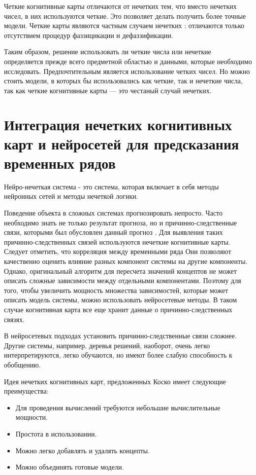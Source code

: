 Четкие когнитивные карты отличаются от нечетких тем, что
вместо нечетких чисел, в них используются четкие. Это позволяет
делать получить более точные модели.
Четкие карты являются частным случаем нечетких \cite{kayashev2014cognitive}: отличаются только отсутствием
процедур фаззицикации и дефаззификации.

Таким образом, решение использовать ли четкие числа или нечеткие
определяется прежде всего предметной областью и данными, которые
необходимо исследовать. Предпочтительным является использование
четких чисел. Но можно стоить модели, в которых бы использовались
как четкие, так и нечеткие числа, так как четкие когнитивные
карты --- это честаный случай нечетких.

\section{Интеграция нечетких когнитивных карт и нейросетей для предсказания временных рядов}

Нейро-нечеткая система - это система, которая включает в себя методы нейронных сетей и методы нечеткой логики.

Поведение объекта в сложных системах прогнозировать непросто.
Часто необходимо знать не только результат прогноза,
но и причинно-следственные связи, которыми был обусловлен данный прогноз
\cite{osoba2019dags} \cite{efficient_fcms}.
Для выявления таких причинно-следственных связей используются нечеткие когнитивные карты.
Следует отметить, что корреляция между временными ряда
Они позволяют качественно оценить влияние разных компонент системы на другие компоненты.
Однако, оригинальный алгоритм для пересчета значений концептов
не может описать сложные зависимости между отдельными компонентами.
Поэтому для того, чтобы увеличить мощность множества зависимостей, которые
может описать модель системы, можно использовать нейросетевые методы.
В таком случае когнитивная карта все еще хранит данные о причинно-следственных связях.

В нейросетевых подходах установить причинно-следственные связи сложнее.
Другие системы, например, деревья решений, наоборот, очень легко интерпретируются, легко обучаются,
но имеют более слабую способность к обобщению.

Идея нечетких когнитивных карт, предложенных Коско \cite{kosko1986fuzzy} имеет следующие преимущества:

\begin{itemize}
	\item Для проведения вычислений требуются небольшие вычислительные мощности.
	\item Простота в использовании.
	\item Можно легко добавлять и удалять концепты.
	\item Можно объединять готовые модели.
\end{itemize}

